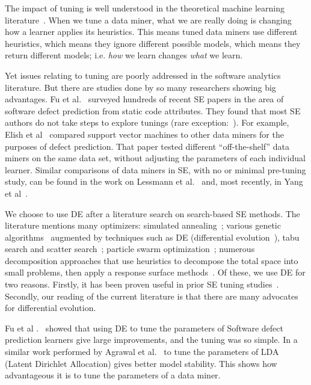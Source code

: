 \documentclass[conference]{IEEEtran}
\begin{document}
The impact of tuning is well understood in the theoretical machine learning literature~\cite{bergstra2012random}.  When we tune a
data miner, what we are really doing is changing how a learner applies its
heuristics. This means tuned data miners use different heuristics, which means
they ignore different possible models, which means they return different models;
i.e. \textit{how} we learn changes \textit{what} we learn.

Yet issues relating to
tuning are poorly addressed in the software analytics literature. But there are studies done by so many researchers showing big advantages. Fu et al.~\cite{fu2016tuning} surveyed hundreds of recent SE papers in the area
of software defect prediction from static code attributes. They found that most SE
  authors do not take steps to explore tunings (rare exception:~\cite{tantithamthavorn2016icse}). For example, Elish et
  al~\cite{elish2008predicting} compared support vector machines to other data
  miners for the purposes of defect prediction. That paper tested different
  ``off-the-shelf'' data miners on the same data set, without adjusting the
  parameters of each individual learner. Similar comparisons of data miners in SE,
with no or minimal pre-tuning study, can be found in the work on Lessmann et al.~\cite{4527256}
and, most recently, in Yang et al~\cite{Yang:2016}.  

We choose to use DE after a literature search on search-based SE methods.
The literature mentions many optimizers: simulated
annealing~\cite{feather2002converging, menzies2007business}; various genetic
algorithms~\cite{goldberg1979complexity} augmented by techniques such as
DE (differential evolution~\cite{storn1997differential}), tabu search and scatter
search~\cite{glover1986general, beausoleil2006moss, molina2007sspmo,nebro2008abyss}; particle swarm optimization~\cite{pan2008particle}; numerous
decomposition approaches that use heuristics to decompose the total space into
small problems, then apply a response surface methods~\cite{krall2015gale, zuluaga2013active}.
Of these, we use DE for two reasons. Firstly, it has been proven useful in prior SE tuning
studies~\cite{fu2016tuning,agrawal2016wrong}. Secondly, our reading of the current literature is
that there are many advocates for differential evolution.

Fu et al .~\cite{fu2016tuning} showed that using DE to tune the parameters of Software defect prediction learners give large improvements, and the tuning was so simple. In a similar work performed by Agrawal et al.~\cite{agrawal2016wrong} to tune the parameters of LDA (Latent Dirichlet Allocation) gives better model stability. This shows how advantageous it is to tune the parameters of a data miner.
\end{document}
